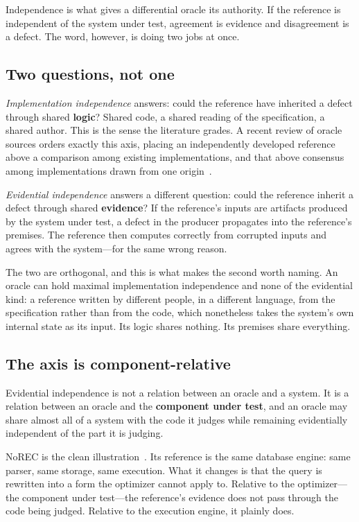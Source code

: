 Independence is what gives a differential oracle its authority. If the reference is
independent of the system under test, agreement is evidence and disagreement is a
defect. The word, however, is doing two jobs at once.

\subsection{Two questions, not one}

\emph{Implementation independence} answers: could the reference have inherited a
defect through shared \textbf{logic}? Shared code, a shared reading of the
specification, a shared author. This is the sense the literature grades. A recent
review of oracle sources orders exactly this axis, placing an independently
developed reference above a comparison among existing implementations, and that
above consensus among implementations drawn from one origin~\cite{oraclesurvey2026}.

\emph{Evidential independence} answers a different question: could the reference
inherit a defect through shared \textbf{evidence}? If the reference's inputs are
artifacts produced by the system under test, a defect in the producer propagates
into the reference's premises. The reference then computes correctly from corrupted
inputs and agrees with the system---for the same wrong reason.

The two are orthogonal, and this is what makes the second worth naming. An oracle
can hold maximal implementation independence and none of the evidential kind: a
reference written by different people, in a different language, from the
specification rather than from the code, which nonetheless takes the system's own
internal state as its input. Its logic shares nothing. Its premises share
everything.



\subsection{The axis is component-relative}

Evidential independence is not a relation between an oracle and a system. It is a
relation between an oracle and the \textbf{component under test}, and an oracle may
share almost all of a system with the code it judges while remaining evidentially
independent of the part it is judging.

NoREC is the clean illustration~\cite{rigger2020norec}. Its reference is the same
database engine: same parser, same storage, same execution. What it changes is that
the query is rewritten into a form the optimizer cannot apply to. Relative to the
optimizer---the component under test---the reference's evidence does not pass
through the code being judged. Relative to the execution engine, it plainly does.

